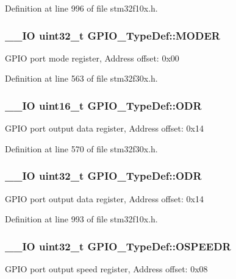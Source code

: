 Definition at line 996 of file stm32f10x.\-h.

\hypertarget{struct_g_p_i_o___type_def_ac2505d096b6b650f1647b8e0ff8b196b}{
\subsubsection[{M\-O\-D\-E\-R}]{\setlength{\rightskip}{0pt plus 5cm}\-\_\-\-\_\-\-I\-O {\bf uint32\-\_\-t} G\-P\-I\-O\-\_\-\-Type\-Def\-::\-M\-O\-D\-E\-R}}\label{struct_g_p_i_o___type_def_ac2505d096b6b650f1647b8e0ff8b196b}
G\-P\-I\-O port mode register, Address offset\-: 0x00 

Definition at line 563 of file stm32f30x.\-h.

\hypertarget{struct_g_p_i_o___type_def_a85ce31084cefb4431ee8fd397555a82f}{
\subsubsection[{O\-D\-R}]{\setlength{\rightskip}{0pt plus 5cm}\-\_\-\-\_\-\-I\-O {\bf uint16\-\_\-t} G\-P\-I\-O\-\_\-\-Type\-Def\-::\-O\-D\-R}}\label{struct_g_p_i_o___type_def_a85ce31084cefb4431ee8fd397555a82f}
G\-P\-I\-O port output data register, Address offset\-: 0x14 

Definition at line 570 of file stm32f30x.\-h.

\hypertarget{struct_g_p_i_o___type_def_a6fb78f4a978a36032cdeac93ac3c9c8b}{
\subsubsection[{O\-D\-R}]{\setlength{\rightskip}{0pt plus 5cm}\-\_\-\-\_\-\-I\-O {\bf uint32\-\_\-t} G\-P\-I\-O\-\_\-\-Type\-Def\-::\-O\-D\-R}}\label{struct_g_p_i_o___type_def_a6fb78f4a978a36032cdeac93ac3c9c8b}
G\-P\-I\-O port output data register, Address offset\-: 0x14 

Definition at line 993 of file stm32f10x.\-h.

\hypertarget{struct_g_p_i_o___type_def_a0d233d720f18ae2050f9131fa6faf7c6}{
\subsubsection[{O\-S\-P\-E\-E\-D\-R}]{\setlength{\rightskip}{0pt plus 5cm}\-\_\-\-\_\-\-I\-O {\bf uint32\-\_\-t} G\-P\-I\-O\-\_\-\-Type\-Def\-::\-O\-S\-P\-E\-E\-D\-R}}\label{struct_g_p_i_o___type_def_a0d233d720f18ae2050f9131fa6faf7c6}
G\-P\-I\-O port output speed register, Address offset\-: 0x08 

